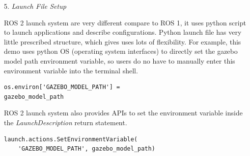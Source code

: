 \documentclass[letterpaper, 10 pt, conference]{ieeeconf}  %
\begin{document}
5. \textit{Launch File Setup} \par\vspace{5pt}
ROS 2 launch system are very different compare to ROS 1, it uses python script to launch applications and describe configurations. Python launch file has very little prescribed structure, which gives uses lots of flexibility. For example, this demo uses python OS (operating system interfaces) to directly set the gazebo model path environment variable, so users do no have to manually enter this environment variable into the terminal shell. 
\par\vspace{2pt}
\begin{small}
\begin{verbatim}
os.environ['GAZEBO_MODEL_PATH'] =
gazebo_model_path
\end{verbatim}
\end{small}
ROS 2 launch system also provides APIs to set the environment variable inside the \textit{LaunchDescription} return statement.
\begin{small}
\begin{verbatim}
launch.actions.SetEnvironmentVariable(
    'GAZEBO_MODEL_PATH', gazebo_model_path)
\end{verbatim}
\end{small}
\par\vspace{1pt}
\end{document}
